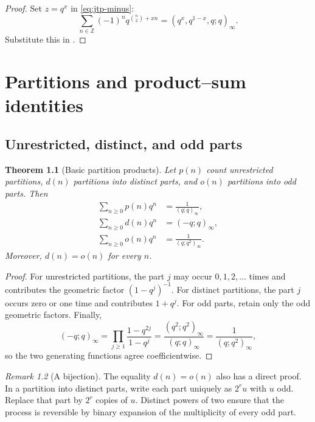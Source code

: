 \documentclass[11pt,oneside,openany]{book}
\newtheorem{theorem}{Theorem}[chapter]
\theoremstyle{definition}
\theoremstyle{remark}
\newtheorem{remark}[theorem]{Remark}
\newcommand{\Z}{\mathbb Z}
\begin{document}
\begin{proof}
Set $z=q^x$ in \eqref{eq:jtp-minus}:
\[
 \sum_{n\in\Z}(-1)^nq^{\binom n2+xn}
 =(q^x,q^{1-x},q;q)_\infty.
\]
Substitute this in .
\end{proof}

\chapter{Partitions and product--sum identities}\label{chap:partitions}

\section{Unrestricted, distinct, and odd parts}

\begin{theorem}[Basic partition products]\label{thm:partition-products}
Let $p(n)$ count unrestricted partitions, $d(n)$ partitions into distinct parts, and $o(n)$ partitions into odd parts.  Then
\begin{align*}
 \sum_{n\ge0}p(n)q^n&=\frac1{(q;q)_\infty},\\
 \sum_{n\ge0}d(n)q^n&=(-q;q)_\infty,\\
 \sum_{n\ge0}o(n)q^n&=\frac1{(q;q^2)_\infty}.
\end{align*}
Moreover, $d(n)=o(n)$ for every $n$.
\end{theorem}

\begin{proof}
For unrestricted partitions, the part $j$ may occur $0,1,2,\dots$ times and contributes the geometric factor $(1-q^j)^{-1}$.  For distinct partitions, the part $j$ occurs zero or one time and contributes $1+q^j$.  For odd parts, retain only the odd geometric factors.  Finally,
\[
 (-q;q)_\infty
 =\prod_{j\ge1}\frac{1-q^{2j}}{1-q^j}
 =\frac{(q^2;q^2)_\infty}{(q;q)_\infty}
 =\frac1{(q;q^2)_\infty},
\]
so the two generating functions agree coefficientwise.
\end{proof}

\begin{remark}[A bijection]
The equality $d(n)=o(n)$ also has a direct proof.  In a partition into distinct parts, write each part uniquely as $2^ru$ with $u$ odd.  Replace that part by $2^r$ copies of $u$.  Distinct powers of two ensure that the process is reversible by binary expansion of the multiplicity of every odd part.
\end{remark}
\end{document}

